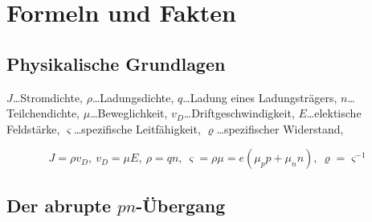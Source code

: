 \documentclass{article}
\begin{document}
\section{Formeln und Fakten}

\subsection{Physikalische Grundlagen}

$J$\ldots Stromdichte,
$\rho$\ldots Ladungsdichte,
$q$\ldots Ladung eines Ladungsträgers,
$n$\ldots Teilchendichte,
$\mu$\ldots Beweglichkeit,
$v_D$\ldots Driftgeschwindigkeit,
$E$\ldots elektische Feldstärke,
$\varsigma$\ldots spezifische Leitfähigkeit,
$\varrho$\ldots spezifischer Widerstand,

$$
J = \rho v_D,\ v_D=\mu E,\ \rho=qn,\ \varsigma=\rho\mu=e(\mu_p p+\mu_n n),\ \varrho=\varsigma^{-1} 
$$

\subsection{Der abrupte $pn$-Übergang}
\end{document}
